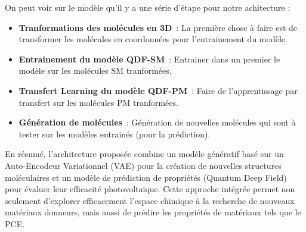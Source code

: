 On peut voir sur le modèle qu'il y a une série d'étape pour notre achitecture :
\begin{itemize}
    \item \textbf{Tranformations des molécules en 3D} : La première chose à faire est de transformer les molécules en coordonnées pour l'entrainement du modèle.
    \item \textbf{Entrainement du modèle QDF-SM} : Entrainer dans un premier le modèle sur les molécules SM tranformées.
    \item \textbf{Transfert Learning du modèle QDF-PM} : Faire de l'apprentissage par transfert sur les molécules PM tranformées.
    \item \textbf{Génération de molécules} : Génération de nouvelles molécules qui sont à tester sur les modèles entrainés (pour la prédiction).
\end{itemize}

En résumé, l’architecture proposée combine un modèle génératif basé sur un Auto-Encodeur Variationnel (VAE) pour la création de nouvelles structures moléculaires et un modèle de prédiction de propriétés (Quantum Deep Field) pour évaluer leur efficacité photovoltaïque. 
Cette approche intégrée permet non seulement d’explorer efficacement l’espace chimique à la recherche de nouveaux matériaux donneurs, mais aussi de prédire les propriétés de matériaux tels que le PCE.